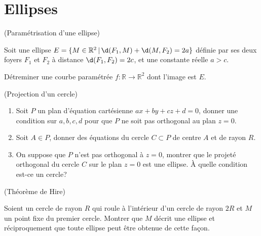 \documentclass[a4paper,12pt,reqno]{amsart}
\begin{document}

\section{Ellipses}

\begin{exo} (Paramétrisation d'une ellipse)


  Soit une ellipse $E = \{ M \in \mathbb{R}^{2} \,|\, \d(F_{1},M)+\d(M,F_{2})=2a\}$ définie par ses deux foyers $F_{1}$ et $F_{2}$ à distance $\d(F_{1},F_{2})=2c$, et une constante réelle $a > c$.

  Détreminer une courbe paramétrée $f:\mathbb{R}\to\mathbb{R}^{2}$ dont l'image est $E$.
\end{exo}


\begin{exo} (Projection d'un cercle)

  \begin{enumerate}
    \item  Soit $P$ un plan d'équation cartésienne $ax+by+cz+d=0$, donner une condition sur $a,b,c,d$ pour que $P$ ne soit pas orthogonal au plan $z=0$.
    \item Soit $A\in P$, donner des équations du cercle $C\subset P$ de centre $A$ et de rayon $R$.
    \item On suppose que $P$ n'est pas orthogonal à $z=0$, montrer que le projeté orthogonal du cercle $C$ sur le plan $z=0$ est une ellipse.  À quelle condition est-ce un cercle?
  \end{enumerate}

\end{exo}


\begin{exo} (Théorème de Hire)


  Soient un cercle de rayon $R$ qui roule à l'intérieur d'un cercle de rayon $2R$ et $M$ un point fixe du premier cercle. Montrer que $M$ décrit une ellipse et réciproquement que toute ellipse peut être obtenue de cette façon.

\end{exo}
\end{document}
